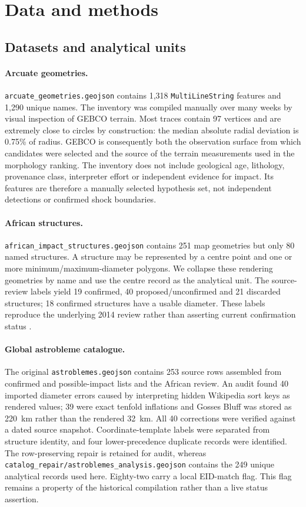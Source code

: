 \documentclass[11pt]{article}
\newcommand{\dataset}[1]{\texttt{#1}}
\begin{document}
\section{Data and methods}
\subsection{Datasets and analytical units}
\paragraph{Arcuate geometries.} \dataset{arcuate\_geometries.geojson} contains 1,318 \texttt{MultiLineString} features and 1,290 unique names. The inventory was compiled manually over many weeks by visual inspection of GEBCO terrain. Most traces contain 97 vertices and are extremely close to circles by construction: the median absolute radial deviation is 0.75\% of radius. GEBCO is consequently both the observation surface from which candidates were selected and the source of the terrain measurements used in the morphology ranking. The inventory does not include geological age, lithology, provenance class, interpreter effort or independent evidence for impact. Its features are therefore a manually selected hypothesis set, not independent detections or confirmed shock boundaries.

\paragraph{African structures.} \dataset{african\_impact\_structures.geojson} contains 251 map geometries but only 80 named structures. A structure may be represented by a centre point and one or more minimum/maximum-diameter polygons. We collapse these rendering geometries by name and use the centre record as the analytical unit. The source-review labels yield 19 confirmed, 40 proposed/unconfirmed and 21 discarded structures; 18 confirmed structures have a usable diameter. These labels reproduce the underlying 2014 review rather than asserting current confirmation status \cite{ReimoldKoeberl2014}.

\paragraph{Global astrobleme catalogue.} The original \dataset{astroblemes.geojson} contains 253 source rows assembled from confirmed and possible-impact lists and the African review. An audit found 40 imported diameter errors caused by interpreting hidden Wikipedia sort keys as rendered values; 39 were exact tenfold inflations and Gosses Bluff was stored as 220~km rather than the rendered 32~km. All 40 corrections were verified against a dated source snapshot. Coordinate-template labels were separated from structure identity, and four lower-precedence duplicate records were identified. The row-preserving repair is retained for audit, whereas \dataset{catalog\_repair/astroblemes\_analysis.geojson} contains the 249 unique analytical records used here. Eighty-two carry a local EID-match flag. This flag remains a property of the historical compilation rather than a live status assertion.
\end{document}
